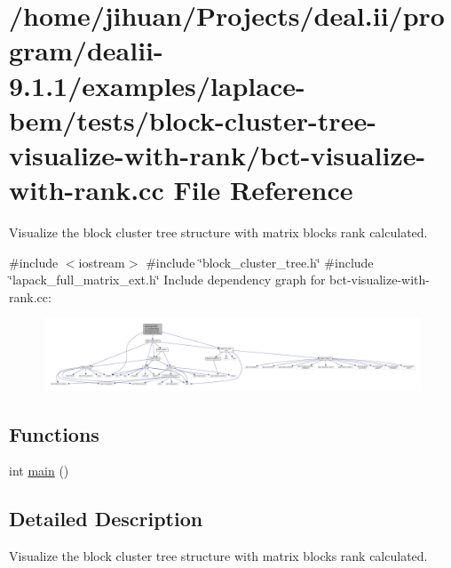 \hypertarget{bct-visualize-with-rank_8cc}{}\section{/home/jihuan/\+Projects/deal.ii/program/dealii-\/9.1.1/examples/laplace-\/bem/tests/block-\/cluster-\/tree-\/visualize-\/with-\/rank/bct-\/visualize-\/with-\/rank.cc File Reference}
\label{bct-visualize-with-rank_8cc}


Visualize the block cluster tree structure with matrix block\textquotesingle{}s rank calculated.  


{\ttfamily \#include $<$iostream$>$}\newline
{\ttfamily \#include \char`\"{}block\+\_\+cluster\+\_\+tree.\+h\char`\"{}}\newline
{\ttfamily \#include \char`\"{}lapack\+\_\+full\+\_\+matrix\+\_\+ext.\+h\char`\"{}}\newline
Include dependency graph for bct-\/visualize-\/with-\/rank.cc\+:\nopagebreak
\begin{figure}[H]
\begin{center}
\leavevmode
\includegraphics[width=350pt]{bct-visualize-with-rank_8cc__incl}
\end{center}
\end{figure}
\subsection*{Functions}
\begin{DoxyCompactItemize}
\item 
int \hyperlink{bct-visualize-with-rank_8cc_ae66f6b31b5ad750f1fe042a706a4e3d4}{main} ()
\end{DoxyCompactItemize}


\subsection{Detailed Description}
Visualize the block cluster tree structure with matrix block\textquotesingle{}s rank calculated. 


